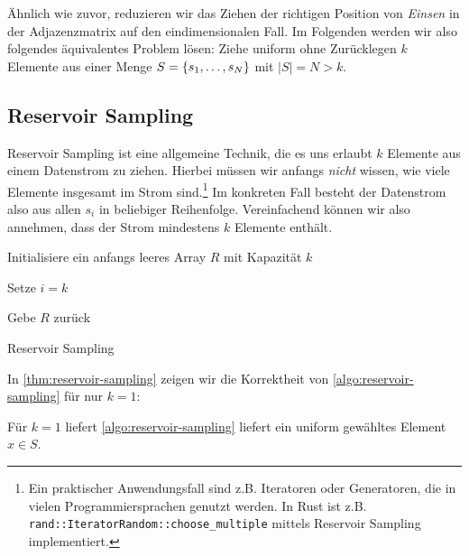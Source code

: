 Ähnlich wie zuvor, reduzieren wir das Ziehen der richtigen Position von \emph{Einsen} in der Adjazenzmatrix auf den eindimensionalen Fall.
Im Folgenden werden wir also folgendes äquivalentes Problem lösen:
Ziehe uniform ohne Zurücklegen $k$ Elemente aus einer Menge $S = \left\{s_1, \ldots, s_N\right\}$ mit $|S| = N > k$.

\subsection{Reservoir Sampling}
Reservoir Sampling ist eine allgemeine Technik, die es uns erlaubt $k$ Elemente aus einem Datenstrom zu ziehen.
Hierbei müssen wir anfangs \emph{nicht} wissen, wie viele Elemente insgesamt im Strom sind.\footnote{
    Ein praktischer Anwendungsfall sind z.B. Iteratoren oder Generatoren, die in vielen Programmiersprachen genutzt werden.
    In Rust ist z.B. \texttt{rand::IteratorRandom::choose\_multiple} mittels Reservoir Sampling implementiert.
}
Im konkreten Fall besteht der Datenstrom also aus allen $s_i$ in beliebiger Reihenfolge.
Vereinfachend können wir also annehmen, dass der Strom mindestens $k$ Elemente enthält.

\begin{algorithm}[H]

    Initialisiere ein anfangs leeres Array $R$ mit Kapazität $k$\;


    Setze $i = k$\;

    Gebe $R$ zurück

    \caption{Reservoir Sampling}
    \label{algo:reservoir-sampling}
\end{algorithm}

\bigskip
\bigskip

\noindent
In \cref{thm:reservoir-sampling} zeigen wir die Korrektheit von \cref{algo:reservoir-sampling} für nur $k = 1$:
\begin{theorem}\label{thm:reservoir-sampling}
    Für $k=1$ liefert \cref{algo:reservoir-sampling} liefert ein uniform gewähltes Element $x\in S$.
\end{theorem}

